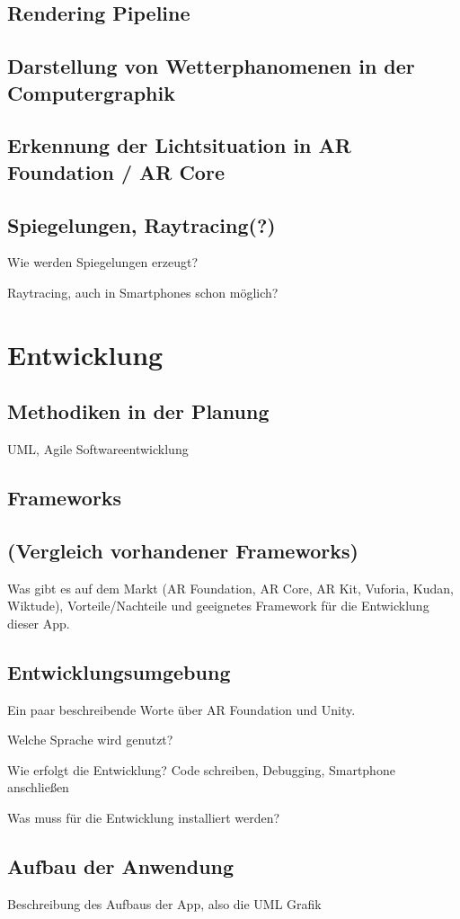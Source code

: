 \subsection{Rendering Pipeline}
\subsection{Darstellung von Wetterphanomenen in der Computergraphik}
\subsection{Erkennung der Lichtsituation in AR Foundation / AR Core}
\subsection{Spiegelungen, Raytracing(?)}
Wie werden Spiegelungen erzeugt?

Raytracing, auch in Smartphones schon möglich?

\section{Entwicklung}
\subsection{Methodiken in der Planung}
UML, Agile Softwareentwicklung

\subsection{Frameworks}
\subsection{(Vergleich vorhandener Frameworks)}
Was gibt es auf dem Markt (AR Foundation, AR Core, AR Kit, Vuforia, Kudan, Wiktude), Vorteile/Nachteile und geeignetes Framework für die Entwicklung dieser App.
\subsection{Entwicklungsumgebung}
Ein paar beschreibende Worte über AR Foundation und Unity.

Welche Sprache wird genutzt?

Wie erfolgt die Entwicklung? Code schreiben, Debugging, Smartphone anschließen

Was muss für die Entwicklung installiert werden?

\subsection{Aufbau der Anwendung}
Beschreibung des Aufbaus der App, also die UML Grafik

